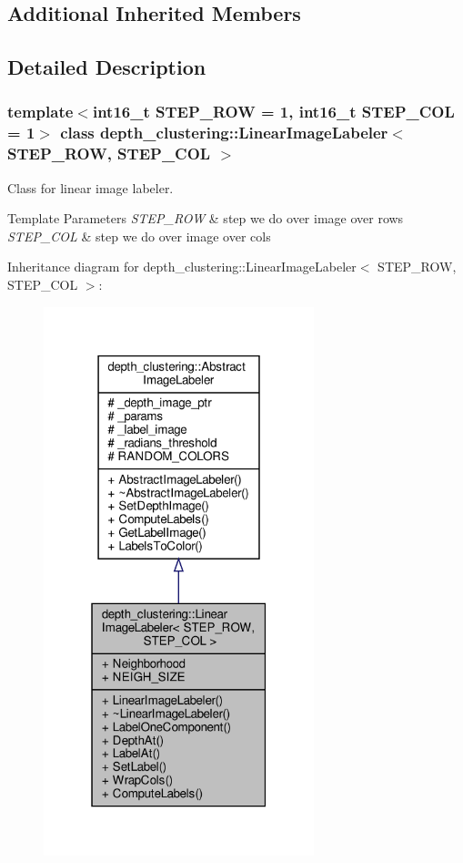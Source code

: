 \subsection*{Additional Inherited Members}


\subsection{Detailed Description}
\subsubsection*{template$<$int16\+\_\+t S\+T\+E\+P\+\_\+\+R\+OW = 1, int16\+\_\+t S\+T\+E\+P\+\_\+\+C\+OL = 1$>$\newline
class depth\+\_\+clustering\+::\+Linear\+Image\+Labeler$<$ S\+T\+E\+P\+\_\+\+R\+O\+W, S\+T\+E\+P\+\_\+\+C\+O\+L $>$}

Class for linear image labeler. 


\begin{DoxyTemplParams}{Template Parameters}
{\em S\+T\+E\+P\+\_\+\+R\+OW} & step we do over image over rows \\
\hline
{\em S\+T\+E\+P\+\_\+\+C\+OL} & step we do over image over cols \\
\hline
\end{DoxyTemplParams}


Inheritance diagram for depth\+\_\+clustering\+:\+:Linear\+Image\+Labeler$<$ S\+T\+E\+P\+\_\+\+R\+OW, S\+T\+E\+P\+\_\+\+C\+OL $>$\+:\nopagebreak
\begin{figure}[H]
\begin{center}
\leavevmode
\includegraphics[width=223pt]{classdepth__clustering_1_1LinearImageLabeler__inherit__graph}
\end{center}
\end{figure}


